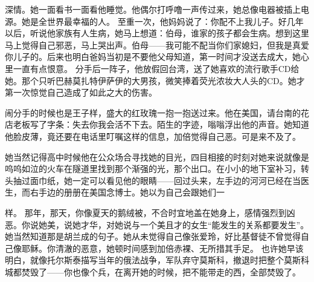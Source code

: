 \documentclass{article}
\begin{document}
\newpage 

深情。她一面看书一面看他睡觉。他偶尔打呼噜一声传过来，她总像电器被插上电源。她是全世界最幸福的人。
至重一次，他妈妈说了：你配不上我儿子。好几年以后，听说他家族有人生病，她马上想道：伯母，谁家的孩子都会生病。想到这里马上觉得自己邪恶，马上哭出声。伯母——我可能不配当你们家媳妇，但我是真爱你儿子的。后来也明白爸妈当初是不要他父母知道，第一时间才没送去成大，她心里一直有点恨意。
分手后一阵子，他放假回台湾，送了她喜欢的流行歌手CD给她。那个只听巴赫莫扎特伊萨伊的大男孩，微笑捧着荧光浓妆大人头的CD。她才第一次惊觉自己造成了如此之大的伤害。

闹分手的时候也是王子样，盛大的红玫瑰一抱一抱送过来。他在美国，请台南的花店老板写了字条：失去你我会活不下去。陌生的字迹，嗡嗡浮出他的声音。她知道他脸皮薄，竟还要在电话里叮嘱这样的信息，加倍觉得自己恶。可是来不及了。

她当然记得高中时候他在公众场合寻找她的目光，四目相接的时刻对她来说就像是呜呜如泣的火车在隧道里找到那个渐强的光，那个出口。在小小的地下室补习，转头抽过面巾纸，她一定可以看见他的眼睛——回过头来，左手边的河河已经在当医生，而右手边的册册在美国念博士。她以为自己会跟她们一

\newpage 

样。
那年，那天，你像夏天的鹅绒被，不合时宜地盖在她身上，感情强烈到凶恶。你说她美，说她才华，对她说与一个美且才的女生“能发生的关系都要发生”。她当然知道那是胡兰成的句子。她从未觉得自己像张爱玲，好比基督徒不曾觉得自己像耶稣。你清澈的恶意，她顿时间感到加倍赤裸、无所措其手足。
也许她早该明白，就像托尔斯泰描写当年的俄法战争，军队弃守莫斯科，撤退时把整个莫斯科城都焚毁了——你也像个兵，在离开她的时候，把不能带走的西，全部焚毁了。
\end{document}
